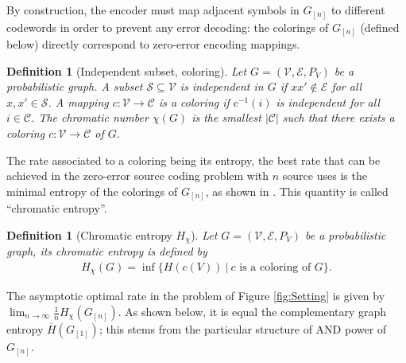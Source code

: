 \documentclass[conference,a4paper]{IEEEtran}
\newtheorem{definition}[theorem]{Definition}
\begin{document}
By construction, the encoder must map adjacent symbols in $G_{[n]}$ to different codewords in order to prevent any error decoding: the colorings of $G_{[n]}$ (defined below) directly correspond to zero-error encoding mappings. 

\begin{definition}[Independent subset, coloring]
Let $G = (\mathcal{V}, \mathcal{E}, P_V)$ be a probabilistic graph. A subset $\mathcal{S} \subseteq \mathcal{V}$ is independent in $G$ if $xx' \notin \mathcal{E}$ for all $x,x' \in \mathcal{S}$. A mapping $c : \mathcal{V} \rightarrow \mathcal{C}$ is a coloring if $c^{-1}(i)$ is independent for all $i \in \mathcal{C}$. The chromatic number $\chi(G)$ is the smallest $|\mathcal{C}|$ such that there exists a coloring $c : \mathcal{V} \rightarrow \mathcal{C}$ of $G$.
\end{definition}

The rate associated to a coloring being its entropy, the best rate that can be achieved in the zero-error source coding problem with $n$ source uses is the minimal entropy of the colorings of $G_{[n]}$, as shown in \cite{alon1996source}. This quantity is called ``chromatic entropy''.

\begin{definition}[Chromatic entropy $H_\chi$]
Let $G = (\mathcal{V}, \mathcal{E}, P_V)$ be a probabilistic graph, its chromatic entropy is defined by
\begin{align}
    H_{\chi}(G) = \inf \lbrace H(c(V)) \:|\: c \text{ is a coloring of } G \rbrace.
\end{align}
\end{definition}

The asymptotic optimal rate in the problem of Figure \ref{fig:Setting} is given by $\lim_{n \rightarrow \infty} \frac{1}{n}H_\chi(G_{[n]})$. As shown below, it is equal the complementary graph entropy $\overline{H}(G_{[1]})$; this stems from the particular structure of AND power of $G_{[n]}$.
\end{document}
